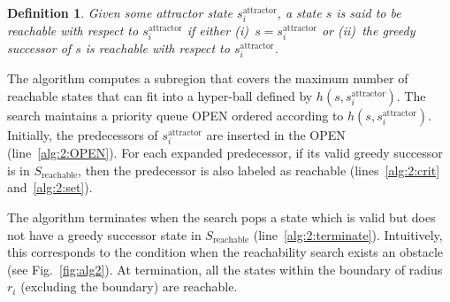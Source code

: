 \documentclass[letterpaper]{article} %
\newcommand{\sAttract}{\ensuremath{s^{\text{attractor}}_i}\xspace}
\newtheorem{definition}{Definition}
\begin{document}
\vspace{2mm}
\begin{definition}
	Given some attractor state \sAttract, a state $s$ is said to be reachable with respect to \sAttract if either
	(i)~$s = \sAttract$ or
	(ii)~the greedy successor of $s$ is reachable with respect to \sAttract.
\end{definition}


The algorithm computes a subregion that covers the maximum number of reachable states that can fit into a hyper-ball defined by $h(s,\sAttract)$. 
The search maintains a priority queue OPEN ordered according to $h(s,\sAttract)$. Initially, the predecessors of $\sAttract$ are inserted in the OPEN (line~\ref{alg:2:OPEN}). For each expanded predecessor, if its valid greedy successor is in $S_{\text{reachable}}$, then the predecessor is also labeled as reachable (lines~\ref{alg:2:crit} and~\ref{alg:2:set}). 


The algorithm terminates when the search pops a state which is valid but does not have a greedy successor state in $S_{\text{reachable}}$ (line~\ref{alg:2:terminate}). Intuitively, this corresponds to the condition when the reachability search exists an obstacle (see Fig.~\ref{fig:alg2}). At termination, all the states within the boundary of radius $r_i$ (excluding the boundary) are reachable.
\end{document}
